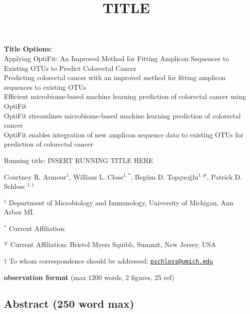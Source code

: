 \documentclass[
  11pt,
]{article}
\title{\textbf{TITLE}}
\author{}
\date{\vspace{-2.5em}}
\begin{document}
\maketitle

\textbf{Title Options:}\\
Applying OptiFit: An Improved Method for Fitting Amplicon Sequences to
Existing OTUs to Predict Colorectal Cancer\\
Predicting colorectal cancer with an improved method for fitting
amplicon sequences to existing OTUs\\
Efficient microbiome-based machine learning prediction of colorectal
cancer using OptiFit\\
OptiFit streamlines microbiome-based machine learning prediction of
colorectal cancer\\
OptiFit enables integration of new amplicon sequence data to existing
OTUs for prediction of colorectal cancer

\vspace{10mm}

Running title: INSERT RUNNING TITLE HERE

\vspace{10mm}

Courtney R. Armour\({^1}\), William L. Close\(^{1,*}\), Begüm D.
Topçuoğlu\(^{1,\#}\), Patrick D. Schloss \(^{1,\dagger}\)

\vspace{5mm}

\({^1}\) Department of Microbiology and Immunology, University of
Michigan, Ann Arbor MI.

\({^*}\) Current Affiliation:

\({^\#}\) Current Affiliation: Bristol Myers Squibb, Summit, New Jersey,
USA~

\(\dagger\) To whom correspondence should be addressed:
\href{mailto:pschloss@umich.edu}{\nolinkurl{pschloss@umich.edu}}

\vspace{10mm}

\textbf{observation format} (max 1200 words, 2 figures, 25 ref)

\newpage

\linenumbers

\hypertarget{abstract-250-word-max}{%
\subsection{Abstract (250 word max)}\label{abstract-250-word-max}}
\end{document}
